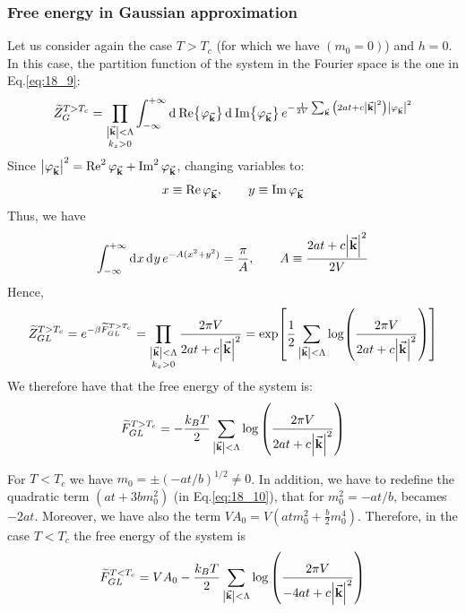 \documentclass[../main/main.tex]{subfiles}
\begin{document}
\subsubsection{Free energy in Gaussian approximation}
Let us consider again the case \( T>T_c \) (for which we have \( (m_0=0) \)) and \( h=0 \). In this case, the partition function of the system in the Fourier space is the one in Eq.\eqref{eq:18_9}:
\begin{equation*}
  \widetilde{Z}_G^{T>T_c} = \prod_{\substack{ \abs{\va{k}} < \Lambda   \\ k_z >0 } }^{}
   \int_{-\infty }^{+\infty } \dd[]{\Re {\varphi _{\va{k}}}}  \dd[]{\Im {\varphi _{\va{k}}}} e^{- \frac{1}{2V} \sum_{\va{k}}^{} \qty(2at+c \abs{\va{k}}^2 ) \abs{\varphi _{\va{k}}}^2}
\end{equation*}
Since \( \abs{\varphi_{\va{k}}}^2 = \Re^2 \varphi_{\va{k}} + \Im^2 \varphi_{\va{k}} \), changing variables to:
\begin{equation*}
   x \equiv  \Re \varphi _{\va{k}}, \qquad  y \equiv  \Im \varphi _{\va{k}}
\end{equation*}
Thus, we have
\begin{equation*}
  \int_{-\infty }^{+\infty } \dd[]{x} \dd[]{y} e^{-A (x^2+y^2)} = \frac{\pi }{A}, \qquad A \equiv  \frac{2at+c \abs{\va{k}}^2}{2V}
\end{equation*}
Hence,
\begin{equation*}
    \widetilde{Z}_{GL}^{T>T_c} = e^{-\beta \widetilde{F}_{GL}^{T>T_c} } =  \prod_{\substack{ \abs{\va{k}} < \Lambda   \\ k_z >0 } }^{} \frac{2 \pi V  }{ 2at+c \abs{\va{k}}^2 }
    = \exp [\frac{1}{2} \sum_{\abs{\va{k}}<\Lambda  }^{} \log (\frac{2 \pi V}{2 a t + c \abs{\va{k}}^2 })   ]
\end{equation*}
We therefore have that the free energy of the system is:
\begin{equation}
  \widetilde{F}_{GL}^{T>T_c} = - \frac{k_B T}{2}  \sum_{\abs{\va{k}}< \Lambda  }^{}
  \log{\qty(\frac{2 \pi V}{2 a t + c \abs{\va{k}}^2 })}
\end{equation}

\begin{remark}
For \( T<T_c \) we have \( m_0 = \pm (-at/b)^{1/2} \neq 0 \). In addition, we have to redefine the quadratic term \( (at+3bm_0^2) \) (in Eq.\eqref{eq:18_10}), that for \( m_0^2 = - at/b \), becames \( -2at \). Moreover, we have also the term \( V A_0 = V (atm_0^2 + \frac{b}{2} m_0^4) \).
Therefore, in the case \( T<T_c \) the free energy of the system is
\begin{equation}
  \widetilde{F}_{GL}^{T<T_c} = V A_0  - \frac{k_B T}{2}  \sum_{\abs{\va{k}}< \Lambda  }^{}
  \log{\qty(\frac{2 \pi V}{ -4 a t + c \abs{\va{k}}^2 })}
\end{equation}
\end{remark}
\end{document}
